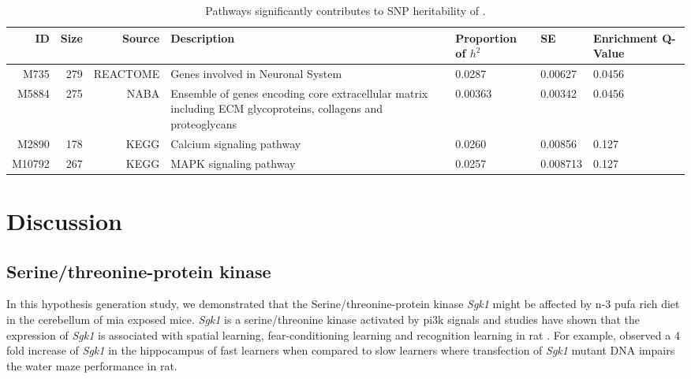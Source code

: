 \begin{landscape}
	\begin{table}
		\begin{tabular}{rrrp{9cm}p{1.7cm}p{1.5cm}p{1.7cm}}
			\toprule
			ID& Size&	Source&	Description&	Proportion of $h^2$&	SE&	Enrichment Q-Value\\
			\midrule
			M735&	279&	REACTOME&	Genes involved in Neuronal System&	0.0287&	0.00627&	0.0456\\
			M5884&	275&	NABA&	Ensemble of genes encoding core extracellular matrix including ECM glycoproteins, collagens and proteoglycans&	0.00363&	0.00342&	0.0456\\
			M2890&	178&	KEGG&	Calcium signaling pathway&	0.0260&	0.00856&	0.127\\
			M10792&	267&	KEGG&	MAPK signaling pathway&	0.0257&	0.008713&	0.127\\	
			\bottomrule
		\end{tabular}
		\caption[Pathways Significantly Contributes to SNP Heritability of Schizophrenia.]{Pathways significantly contributes to \gls{SNP} heritability of .
		}
		\label{tab:partitioning}
	\end{table}
\end{landscape}

\section{Discussion}
\subsection{Serine/threonine-protein kinase}
In this hypothesis generation study, we demonstrated that the Serine/threonine-protein kinase \textit{Sgk1} might be affected by n-3 \gls{pufa} rich diet in the cerebellum of \gls{mia} exposed mice. 
\textit{Sgk1} is a serine/threonine kinase activated by \gls{pi3k} signals and studies have shown that the expression of \textit{Sgk1} is associated with spatial learning, fear-conditioning learning and recognition learning in rat \citep{Tsai2002,Lee2003}.
For example, \citet{Tsai2002} observed a 4 fold increase of \textit{Sgk1} in the hippocampus of fast learners when compared to slow learners where transfection of \textit{Sgk1} mutant DNA impairs the water maze performance in rat.

